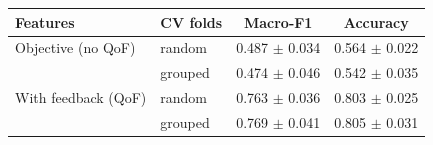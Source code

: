 \begin{tabular}{llcc}
\toprule
Features & CV folds & Macro-F1 & Accuracy \\
\midrule
Objective (no QoF) & random & 0.487 $\pm$ 0.034 & 0.564 $\pm$ 0.022 \\
 & grouped & 0.474 $\pm$ 0.046 & 0.542 $\pm$ 0.035 \\
With feedback (QoF) & random & 0.763 $\pm$ 0.036 & 0.803 $\pm$ 0.025 \\
 & grouped & 0.769 $\pm$ 0.041 & 0.805 $\pm$ 0.031 \\
\bottomrule
\end{tabular}
